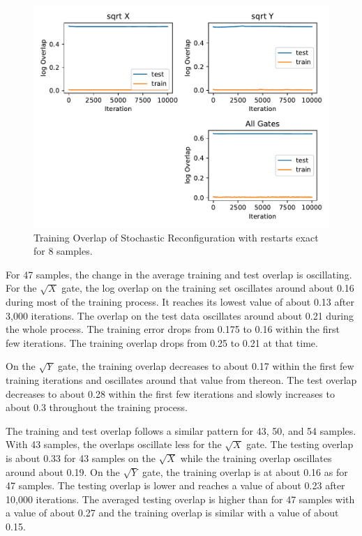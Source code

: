 \begin{figure}[H]
  \centering
  \includegraphics[width=\textwidth]{figures/results/SR-restarts-not-learned/avgOverlap_8.pdf}
  \caption[Training and Testing Overlaps for Stochastic Reconfiguration with Random Restarts and $CZ$ Gates Applied Exactly - 8 Samples]{Training 
  Overlap of Stochastic Reconfiguration with restarts exact for 8 samples.}
  \label{fig:sr_exact_overlap_8}
\end{figure}

For 47 samples, the change in the average training and test overlap is oscillating. For the 
$\sqrt{X}$ gate, the log overlap on the training set oscillates around about 0.16 during most 
of the training process. It 
reaches its lowest value of about 0.13 after 3,000 iterations. The overlap on the test data 
oscillates around about 0.21 during the whole process. The training error drops from 
0.175 to 0.16 within the first few iterations. The training overlap drops from 0.25 to 0.21 at that time.

On the $\sqrt{Y}$ gate, the training overlap decreases to about 0.17 within the first few training iterations 
and oscillates around that value from thereon. The test overlap decreases to about 0.28 within the first few
iterations and slowly increases to about 0.3 throughout the training process.

The training and test overlap follows a similar pattern for 43, 50, and 54 samples.
With 43 samples, the overlaps oscillate less for the $\sqrt{X}$ gate. The testing overlap is about 
0.33 for 43 samples on the $\sqrt{X}$ while the training overlap oscillates around about 0.19.
On the $\sqrt{Y}$ gate, the training overlap is at about 0.16 as for 47 samples. The testing overlap is 
lower and reaches a value of about 0.23 after 10,000 iterations. The averaged testing overlap is higher than 
for 47 samples with a value of about 0.27 and the training overlap is similar with a value of about 0.15.


